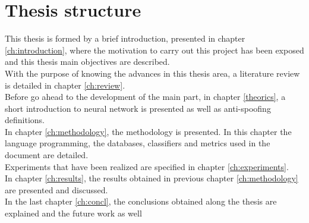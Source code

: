 \section{Thesis structure}
This thesis is formed by a brief introduction, presented in chapter \ref{ch:introduction}, where the motivation to carry out this project has been exposed and this thesis main objectives are described.\\

With the purpose of knowing the advances in this thesis area, a literature review is detailed in chapter \ref{ch:review}.\\

Before go ahead to the development of the main part, in chapter \ref{theorics}, a short introduction to neural network is presented as well as anti-spoofing definitions.\\

In chapter \ref{ch:methodology}, the methodology is presented. In this chapter the language programming, the databases, classifiers and metrics used in the document are detailed.\\

Experiments that have been realized are specified in chapter \ref{ch:experiments}.\\

In chapter \ref{ch:results}, the results obtained in previous chapter \ref{ch:methodology} are presented and discussed.\\

In the last chapter \ref{ch:concl}, the conclusions obtained along the thesis are explained and the future work as well\\
